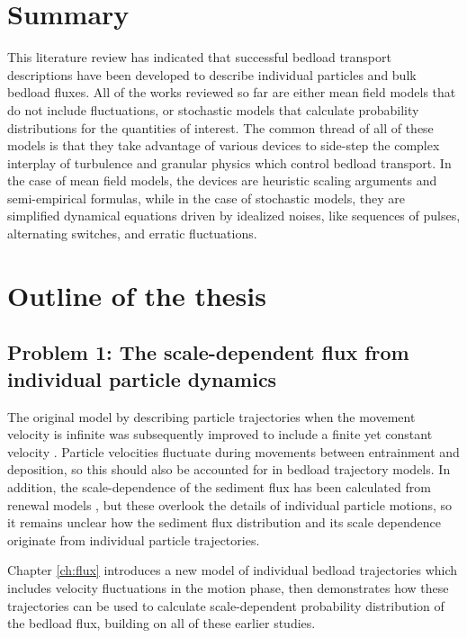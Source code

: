 \section{Summary}

This literature review has indicated that successful bedload transport descriptions have been developed to describe individual particles and bulk bedload fluxes.
All of the works reviewed so far are either mean field models that do not include fluctuations, or stochastic models that calculate probability distributions for the quantities of interest.
The common thread of all of these models is that they take advantage of various devices to side-step the complex interplay of turbulence and granular physics which control bedload transport.
In the case of mean field models, the devices are heuristic scaling arguments and semi-empirical formulas, while in the case of stochastic models, they are simplified dynamical equations driven by idealized noises, like sequences of pulses, alternating switches, and erratic fluctuations.

\section{Outline of the thesis}
\subsection{Problem 1: The scale-dependent flux from individual particle dynamics}

The original model by \citet{Einstein1937} describing particle trajectories when the movement velocity is infinite was subsequently improved to include a finite yet constant velocity \citep{Gordon1972,Lisle1998,Lajeunesse2018}.
Particle velocities fluctuate during movements between entrainment and deposition, so this should also be accounted for in bedload trajectory models.
In addition, the scale-dependence of the sediment flux has been calculated from renewal models \citep{Turowski2010,Ancey2020}, but these overlook the details of individual particle motions, so it remains unclear how the sediment flux distribution and its scale dependence originate from individual particle trajectories.

Chapter \ref{ch:flux} introduces a new model of individual bedload trajectories which includes velocity fluctuations in the motion phase, then demonstrates how these trajectories can be used to calculate scale-dependent probability distribution of the bedload flux, building on all of these earlier studies.

